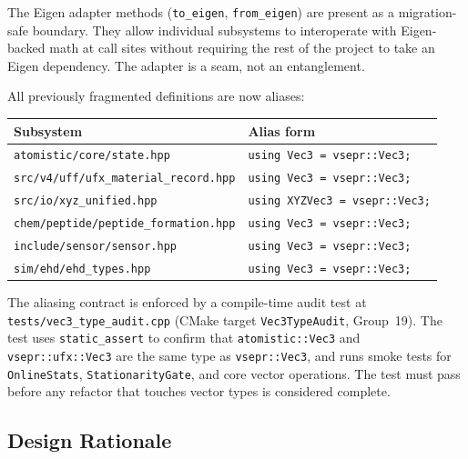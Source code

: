 ﻿\documentclass[11pt]{article}
\newcommand{\file}[1]{\texttt{#1}}
\newcommand{\type}[1]{\texttt{#1}}
\begin{document}
The Eigen adapter methods (\texttt{to\_eigen}, \texttt{from\_eigen}) are
present as a migration-safe boundary. They allow individual subsystems to
interoperate with Eigen-backed math at call sites without requiring the rest
of the project to take an Eigen dependency. The adapter is a seam, not an
entanglement.

All previously fragmented definitions are now aliases:

\begin{center}
\begin{tabular}{ll}
\toprule
Subsystem & Alias form \\
\midrule
\file{atomistic/core/state.hpp}          & \texttt{using Vec3 = vsepr::Vec3;} \\
\file{src/v4/uff/ufx\_material\_record.hpp} & \texttt{using Vec3 = vsepr::Vec3;} \\
\file{src/io/xyz\_unified.hpp}           & \texttt{using XYZVec3 = vsepr::Vec3;} \\
\file{chem/peptide/peptide\_formation.hpp} & \texttt{using Vec3 = vsepr::Vec3;} \\
\file{include/sensor/sensor.hpp}         & \texttt{using Vec3 = vsepr::Vec3;} \\
\file{sim/ehd/ehd\_types.hpp}            & \texttt{using Vec3 = vsepr::Vec3;} \\
\bottomrule
\end{tabular}
\end{center}

The aliasing contract is enforced by a compile-time audit test at
\file{tests/vec3\_type\_audit.cpp} (CMake target \texttt{Vec3TypeAudit},
Group~19). The test uses \texttt{static\_assert} to confirm that
\type{atomistic::Vec3} and \type{vsepr::ufx::Vec3} are the same type as
\type{vsepr::Vec3}, and runs smoke tests for \texttt{OnlineStats},
\texttt{StationarityGate}, and core vector operations. The test must pass
before any refactor that touches vector types is considered complete.

\subsection{Design Rationale}
\end{document}
